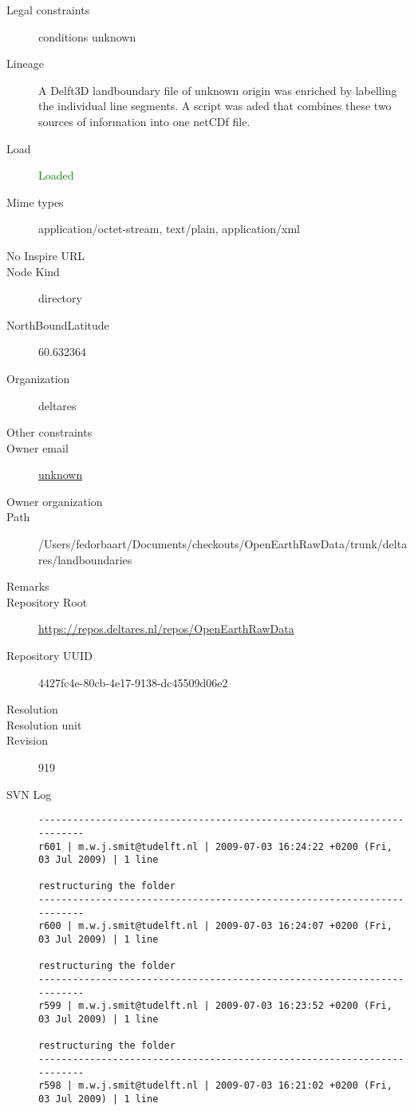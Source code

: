 \documentclass[9]{report}
\begin{document}
\begin{description}
  \item[Legal constraints] conditions unknown
  \item[Lineage] A Delft3D landboundary file of unknown origin was enriched by labelling the individual line segments. A script was aded that combines these two sources of information into one netCDf file.
  \item[Load] \textcolor{green}{Loaded}
  \item[Mime types] application/octet-stream, text/plain, application/xml
  \item[No Inspire URL] 
  \item[Node Kind] directory
  \item[NorthBoundLatitude] 60.632364
  \item[Organization] deltares
  \item[Other constraints] 
  \item[Owner email] \href{mailto:unknown}{unknown}
  \item[Owner organization] 
  \item[Path] /Users/fedorbaart/Documents/checkouts/OpenEarthRawData/trunk/deltares/landboundaries
  \item[Remarks] 
  \item[Repository Root] \href{https://repos.deltares.nl/repos/OpenEarthRawData}{https://repos.deltares.nl/repos/OpenEarthRawData}
  \item[Repository UUID] 4427fc4e-80cb-4e17-9138-dc45509d06e2
  \item[Resolution] 
  \item[Resolution unit] 
  \item[Revision] 919
  \item[SVN Log] \begin{verbatim}
------------------------------------------------------------------------
r601 | m.w.j.smit@tudelft.nl | 2009-07-03 16:24:22 +0200 (Fri, 03 Jul 2009) | 1 line

restructuring the folder
------------------------------------------------------------------------
r600 | m.w.j.smit@tudelft.nl | 2009-07-03 16:24:07 +0200 (Fri, 03 Jul 2009) | 1 line

restructuring the folder
------------------------------------------------------------------------
r599 | m.w.j.smit@tudelft.nl | 2009-07-03 16:23:52 +0200 (Fri, 03 Jul 2009) | 1 line

restructuring the folder
------------------------------------------------------------------------
r598 | m.w.j.smit@tudelft.nl | 2009-07-03 16:21:02 +0200 (Fri, 03 Jul 2009) | 1 line


\end{verbatim}
\end{description}
\end{document}
